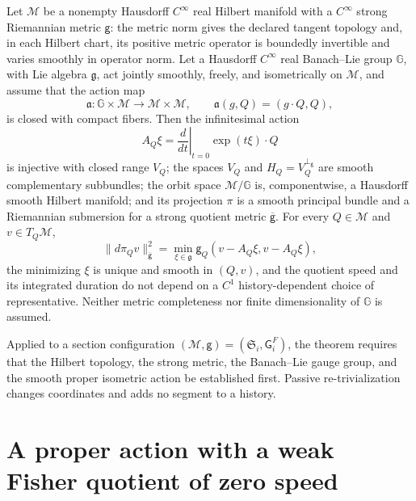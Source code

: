 Let \(\mathcal M\) be a nonempty Hausdorff \(C^\infty\) real Hilbert manifold
with a \(C^\infty\) strong Riemannian metric \(\mathsf g\): the metric norm gives
the declared tangent topology and, in each Hilbert chart, its positive metric
operator is boundedly invertible and varies smoothly in operator norm. Let a
Hausdorff \(C^\infty\) real Banach--Lie group \(\mathbb G\), with Lie algebra
\(\mathfrak g\), act jointly smoothly, freely, and isometrically on
\(\mathcal M\), and assume that the action map
\begin{equation}
\mathfrak a:\mathbb G\times\mathcal M\longrightarrow
\mathcal M\times\mathcal M,
\qquad
\mathfrak a(g,Q)=(g\cdot Q,Q),
\label{eq:hist-proper-action-map}
\end{equation}
is closed with compact fibers. Then the infinitesimal action
\begin{equation}
A_Q\xi=\left.\frac{d}{dt}\right|_{t=0}\exp(t\xi)\cdot Q
\label{eq:hist-infinitesimal-orbit-map}
\end{equation}
is injective with closed range \(V_Q\); the spaces \(V_Q\) and
\(H_Q=V_Q^{\perp_{\mathsf g}}\) are smooth complementary subbundles; the orbit
space \(\mathcal M/\mathbb G\) is, componentwise, a Hausdorff smooth Hilbert
manifold; and its projection \(\pi\) is a smooth principal bundle and a
Riemannian submersion for a strong quotient metric \(\overline{\mathsf g}\).
For every \(Q\in\mathcal M\) and \(v\in T_Q\mathcal M\),
\begin{equation}
\|d\pi_Qv\|_{\overline{\mathsf g}}^2
=\min_{\xi\in\mathfrak g}\mathsf g_Q(v-A_Q\xi,v-A_Q\xi),
\label{eq:hist-quotient-gauge-speed}
\end{equation}
the minimizing \(\xi\) is unique and smooth in \((Q,v)\), and the quotient speed
and its integrated duration do not depend on a \(C^1\) history-dependent choice
of representative. Neither metric completeness nor finite dimensionality of
\(\mathbb G\) is assumed. 

Applied to a section configuration \((\mathcal M,\mathsf g)=(\mathfrak S_i,\mathsf G_i^F)\),
the theorem requires that the Hilbert topology, the strong metric, the
Banach--Lie gauge group, and the smooth proper isometric action be established
first. Passive re-trivialization changes coordinates and adds no segment to a
history.

\section{A proper action with a weak Fisher quotient of zero speed}
\label{sec:hist-weak-fisher-quotient}

